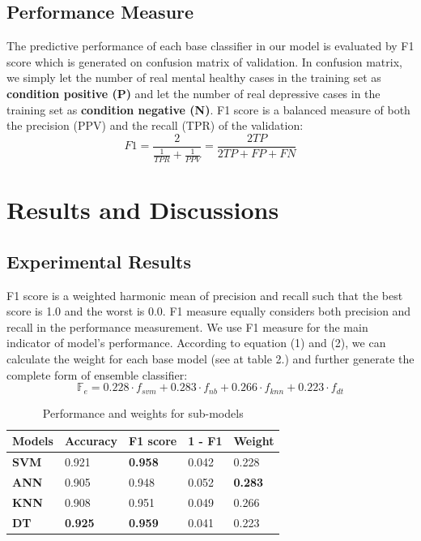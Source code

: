 \documentclass[10pt,journal,compsoc]{IEEEtran}
\begin{document}
\subsection{Performance Measure}
The predictive performance of each base classifier in our model is evaluated by F1 score which is generated on confusion matrix of validation. In confusion matrix, we simply let the number of real mental healthy cases in the training set as \textbf{condition positive (P)} and let the number of real depressive cases in the training set as  \textbf{condition negative (N)}. F1 score is a balanced measure of both the precision (PPV) and the recall (TPR) of the validation: 
\begin{equation}\label{reio}
	F1 = \frac{2 }{\frac{1}{TPR} + \frac{1}{PPV}} = \frac{2TP}{2TP + FP + FN}
\end{equation}
%
%
%
%
%
%
%
\section{Results and Discussions}
\subsection{Experimental Results}
F1 score is a weighted harmonic mean of precision and recall such that the best score is 1.0 and the worst is 0.0. F1 measure equally considers both precision and recall in the performance measurement. We use F1 measure for the main indicator of model's performance. According to equation (1) and (2), we can calculate the weight for each base model (see at table 2.) and further generate the complete form of ensemble classifier:
\begin{equation}
\mathbb{F}_{e} = 0.228 \cdot f_{svm} + 0.283 \cdot f_{nb} + 0.266 \cdot f_{knn} + 0.223 \cdot f_{dt}
\end{equation}

\begin{table}[ht]
\centering
\begin{tabular}{|C{1cm}|C{1.2cm}|C{1.2cm}|C{0.8cm}|C{1cm}|}
\hline
{} 
{\color[HTML]{000000} \textbf{Models}} & {\color[HTML]{000000} \textbf{Accuracy}} & {\color[HTML]{000000} \textbf{F1 score}} & {\color[HTML]{000000} \textbf{1 - F1}} & {\color[HTML]{000000} \textbf{Weight}} \\ \hline
{} 
\textbf{SVM}& 0.921 & \textbf{0.958}  & 0.042  & 0.228 \\ \hline
{} 
\textbf{ANN} & 0.905 & 0.948  & 0.052   & \textbf{0.283}    \\ \hline
{} 
\textbf{KNN} & 0.908 & 0.951   & 0.049  & 0.266 \\ \hline
{} 
\textbf{DT}  & \textbf{0.925} & \textbf{0.959}  & 0.041  & 0.223  \\ \hline
\end{tabular}
\caption{Performance and weights for sub-models}
\label{weight}
\end{table}
\end{document}
